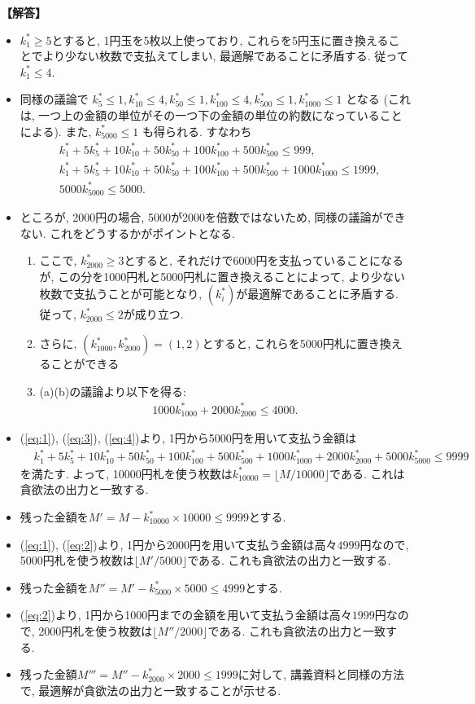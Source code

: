 \documentclass[12pt,a4paper]{article}
\newenvironment{solution}{
    \vspace{0.5em}
    \noindent
    \textbf{【解答】}
    \vspace{0.3em}
}{
    \vspace{1em}
}
\begin{document}
\begin{solution}
\begin{itemize}
\item $k^*_1\ge 5$とすると, 1円玉を5枚以上使っており, これらを5円玉に置き換えることでより少ない枚数で支払えてしまい, 最適解であることに矛盾する. 従って $k^*_1\le 4$.
\item 同様の議論で $k^*_5\le 1,k^*_{10}\le 4,k^*_{50}\le 1,k^*_{100}\le 4,k^*_{500}\le 1, k^*_{1000}\le 1$ となる (これは, 一つ上の金額の単位がその一つ下の金額の単位の約数になっていることによる). また, $k^*_{5000} \le 1$ も得られる. すなわち
\begin{align}
  &k^*_1+5k^*_5+10k^*_{10}+50k^*_{50}+100k^*_{100}+500k^*_{500}\le 999, \label{eq:1} \\
  &k^*_1+5k^*_5+10k^*_{10}+50k^*_{50}+100k^*_{100}+500k^*_{500} + 1000k^*_{1000} \le 1999, \label{eq:2} \\
  &5000 k^*_{5000} \le 5000. \label{eq:3}
\end{align}
\item ところが, 2000円の場合, 5000が2000を倍数ではないため, 同様の議論ができない. これをどうするかがポイントとなる.
\begin{enumerate}
  \item ここで, $k^*_{2000}\ge 3$とすると, それだけで6000円を支払っていることになるが, この分を1000円札と5000円札に置き換えることによって, より少ない枚数で支払うことが可能となり, $(k^*_i)$が最適解であることに矛盾する. 従って, $k^*_{2000} \le 2$が成り立つ.
  \item さらに, $(k^*_{1000},k^*_{2000})=(1,2)$とすると, これらを5000円札に置き換えることができる
  \item (a)(b)の議論より以下を得る:
  \begin{align}
    1000k^*_{1000}+2000k^*_{2000} \le 4000. \label{eq:4}
  \end{align}
\end{enumerate}
\item (\ref{eq:1}), (\ref{eq:3}), (\ref{eq:4})より, 1円から5000円を用いて支払う金額は
\begin{align*}
  &k^*_1+5k^*_5+10k^*_{10}+50k^*_{50}+100k^*_{100}+500k^*_{500}+1000k^*_{1000}+2000k^*_{2000}+5000k^*_{5000} \le 9999
\end{align*}
を満たす. よって, 10000円札を使う枚数は$k^*_{10000} = \lfloor M/10000 \rfloor$である. これは貪欲法の出力と一致する.
\item 残った金額を$M' = M - k^*_{10000} \times 10000 \le 9999$とする. 
\item (\ref{eq:1}), (\ref{eq:2})より, 1円から2000円を用いて支払う金額は高々$4999$円なので, 5000円札を使う枚数は$\lfloor M'/5000 \rfloor$である. これも貪欲法の出力と一致する.
\item 残った金額を$M'' = M' - k^*_{5000} \times 5000 \le 4999$とする.
\item (\ref{eq:2})より, 1円から1000円までの金額を用いて支払う金額は高々$1999$円なので, 2000円札を使う枚数は$\lfloor M''/2000 \rfloor$である. これも貪欲法の出力と一致する.
\item 残った金額$M''' = M'' - k^*_{2000} \times 2000 \le 1999$に対して, 講義資料と同様の方法で, 最適解が貪欲法の出力と一致することが示せる.
\end{itemize}


\end{solution}
\end{document}
